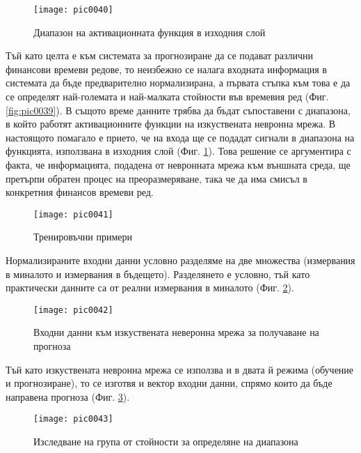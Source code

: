 \begin{figure}[h]
  \centering
  \texttt{[image: pic0040]}
  \caption{Диапазон на активационната функция в изходния слой}
\label{fig:pic0040}
\end{figure}
\FloatBarrier

Тъй като целта е към системата за прогнозиране да се подават различни финансови времеви редове, то неизбежно се налага входната информация в системата да бъде предварително нормализирана, а първата стъпка към това е да се определят най-големата и най-малката стойности във времевия ред (Фиг. \ref{fig:pic0039}). В същото време данните трябва да бъдат съпоставени с диапазона, в който работят активационните функции на изкуствената невронна мрежа. В настоящото помагало е прието, че на входа ще се подадат сигнали в диапазона на функцията, използвана в изходния слой (Фиг. \ref{fig:pic0040}). Това решение се аргументира с факта, че информацията, подадена от невронната мрежа към външната среда, ще претърпи обратен процес на преоразмеряване, така че да има смисъл в конкретния финансов времеви ред.

\begin{figure}[h]
  \centering
  \texttt{[image: pic0041]}
  \caption{Тренировъчни примери}
\label{fig:pic0041}
\end{figure}
\FloatBarrier

Нормализираните входни данни условно разделяме на две множества (измервания в миналото и измервания в бъдещето). Разделянето е условно, тъй като практически данните са от реални измервания в миналото (Фиг. \ref{fig:pic0041}).

\begin{figure}[h]
  \centering
  \texttt{[image: pic0042]}
  \caption{Входни данни към изкуствената неверонна мрежа за получаване на прогноза}
\label{fig:pic0042}
\end{figure}
\FloatBarrier

Тъй като изкуствената невронна мрежа се използва и в двата й режима (обучение и прогнозиране), то се изготвя и вектор входни данни, спрямо които да бъде направена прогноза (Фиг. \ref{fig:pic0042}).

\begin{figure}[h]
  \centering
  \texttt{[image: pic0043]}
  \caption{Изследване на група от стойности за определяне на диапазона}
\label{fig:pic0043}
\end{figure}
\FloatBarrier

